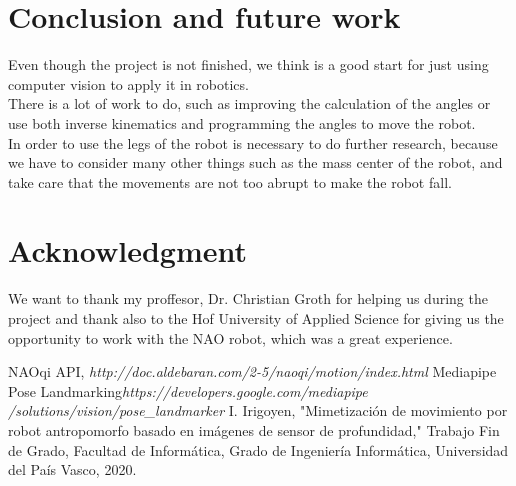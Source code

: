 \documentclass[conference]{IEEEtran}
\begin{document}
\section{Conclusion and future work}
Even though the project is not finished, we think is a good start for just using computer vision to apply it in robotics.
\\
There is a lot of work to do, such as improving the calculation of the angles or use both inverse kinematics and programming the angles to move the robot.
\\
In order to use the legs of the robot is necessary to do further research, because we have to consider many other things such as the mass center of the robot, and take care that the movements are not too abrupt to make the robot fall.

\section*{Acknowledgment}
We want to thank my proffesor, Dr. Christian Groth for helping us during the project and thank also to the Hof University of Applied Science for giving us the opportunity to work with the NAO robot, which was a great experience.



\begin{thebibliography}{00}

 NAOqi API, \textit{http://doc.aldebaran.com/2-5/naoqi/motion/index.html}
 Mediapipe Pose Landmarking\textit{https://developers.google.com/mediapipe
/solutions/vision/pose\_landmarker}
I. Irigoyen, "Mimetización de movimiento por robot antropomorfo basado en imágenes de sensor de profundidad," Trabajo Fin de Grado, Facultad de Informática, Grado de Ingeniería Informática, Universidad del País Vasco, 2020.

\end{thebibliography}
\end{document}

